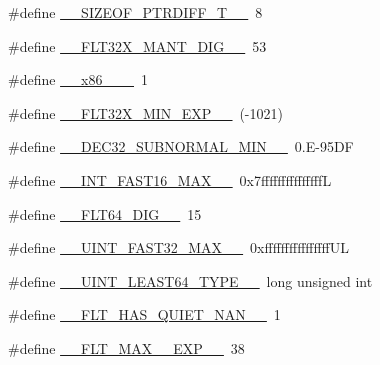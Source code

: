 \begin{DoxyCompactItemize}
\item 
\#define \hyperlink{cmake-build-debug_2babel__client__autogen_2moc__predefs_8h_a2c1c95a99789b8c9721e896c48257f53}{\+\_\+\+\_\+\+S\+I\+Z\+E\+O\+F\+\_\+\+P\+T\+R\+D\+I\+F\+F\+\_\+\+T\+\_\+\+\_\+}~8
\item 
\#define \hyperlink{cmake-build-debug_2babel__client__autogen_2moc__predefs_8h_a63419ad12ec3f4e18746a0a64fcfc136}{\+\_\+\+\_\+\+F\+L\+T32\+X\+\_\+\+M\+A\+N\+T\+\_\+\+D\+I\+G\+\_\+\+\_\+}~53
\item 
\#define \hyperlink{cmake-build-debug_2babel__client__autogen_2moc__predefs_8h_a9d2226f2d9644bcb9db4e3dda746f559}{\+\_\+\+\_\+x86\+\_\+\_\+\+\_\+}~1
\item 
\#define \hyperlink{cmake-build-debug_2babel__client__autogen_2moc__predefs_8h_a87baa4e50d6b00b4be6c3173a4280f2f}{\+\_\+\+\_\+\+F\+L\+T32\+X\+\_\+\+M\+I\+N\+\_\+\+E\+X\+P\+\_\+\+\_\+}~(-\/1021)
\item 
\#define \hyperlink{cmake-build-debug_2babel__client__autogen_2moc__predefs_8h_a1b8832b164a1e36ed6756895a71c7e54}{\+\_\+\+\_\+\+D\+E\+C32\+\_\+\+S\+U\+B\+N\+O\+R\+M\+A\+L\+\_\+\+M\+I\+N\+\_\+\+\_\+}~0.\+E-\/95\+DF
\item 
\#define \hyperlink{cmake-build-debug_2babel__client__autogen_2moc__predefs_8h_ad4f33e46b6c0be1a2bbd83f3efe19165}{\+\_\+\+\_\+\+I\+N\+T\+\_\+\+F\+A\+S\+T16\+\_\+\+M\+A\+X\+\_\+\+\_\+}~0x7fffffffffffffffL
\item 
\#define \hyperlink{cmake-build-debug_2babel__client__autogen_2moc__predefs_8h_a6a7f83363cddf6ce9c8548224f012180}{\+\_\+\+\_\+\+F\+L\+T64\+\_\+\+D\+I\+G\+\_\+\+\_\+}~15
\item 
\#define \hyperlink{cmake-build-debug_2babel__client__autogen_2moc__predefs_8h_a61e63cea5ac78bcf0d282b70d63668e1}{\+\_\+\+\_\+\+U\+I\+N\+T\+\_\+\+F\+A\+S\+T32\+\_\+\+M\+A\+X\+\_\+\+\_\+}~0xffffffffffffffff\+UL
\item 
\#define \hyperlink{cmake-build-debug_2babel__client__autogen_2moc__predefs_8h_a306a0b7c6f110b24a77083abaf3acc7a}{\+\_\+\+\_\+\+U\+I\+N\+T\+\_\+\+L\+E\+A\+S\+T64\+\_\+\+T\+Y\+P\+E\+\_\+\+\_\+}~long unsigned int
\item 
\#define \hyperlink{cmake-build-debug_2babel__client__autogen_2moc__predefs_8h_acb3a3a30075a9589b520df3b329df29e}{\+\_\+\+\_\+\+F\+L\+T\+\_\+\+H\+A\+S\+\_\+\+Q\+U\+I\+E\+T\+\_\+\+N\+A\+N\+\_\+\+\_\+}~1
\item 
\#define \hyperlink{cmake-build-debug_2babel__client__autogen_2moc__predefs_8h_a3641a65e329884d817848ba5d6163f07}{\+\_\+\+\_\+\+F\+L\+T\+\_\+\+M\+A\+X\+\_\+\_\+\+E\+X\+P\+\_\+\+\_\+}~38

\end{DoxyCompactItemize}
